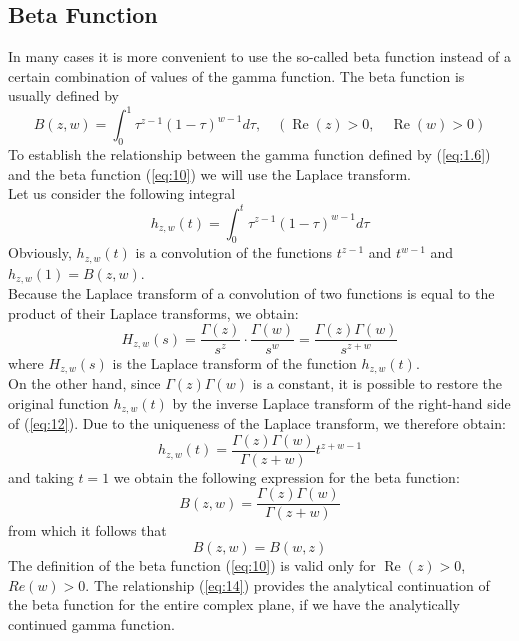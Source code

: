 \documentclass[a4paper,14pt,oneside]{book}
\theoremstyle{plain}
\theoremstyle{definition}
\theoremstyle{remark}
\begin{document}
\begin{center}
\begin{flushleft}
{\section{Beta Function}
In many cases it is more convenient to use the so-called beta function instead of a certain combination of values of the gamma function.
The beta function is usually defined by
\begin{equation}\label{eq:10}
B(z, w)=\int_{0}^{1} \tau^{z-1}(1-\tau)^{w-1} d \tau, \quad(\operatorname{Re}(z)>0, \quad \operatorname{Re}(w)>0)
\end{equation}
To establish the relationship between the gamma function defined by (\ref{eq:1.6}) and the beta function (\ref{eq:10}) we will use the Laplace transform.\\
Let us consider the following integral
\begin{equation}\label{eq:11}
h_{z, w}(t)=\int_{0}^{t} \tau^{z-1}(1-\tau)^{w-1} d \tau
\end{equation}
Obviously, $h_{z, w}(t)$ is a convolution of the functions $t^{z-1}$ and $t^{w-1}$ and $h_{z, w}(1)=B(z, w)$.\\
Because the Laplace transform of a convolution of two functions is equal to the product of their Laplace transforms, we obtain:
\begin{equation}\label{eq:12}
H_{z, w}(s)=\frac{\Gamma(z)}{s^{z}} \cdot \frac{\Gamma(w)}{s^{w}}=\frac{\Gamma(z) \Gamma(w)}{s^{z+w}}
\end{equation}
where $H_{z, w}(s)$ is the Laplace transform of the function $h_{z, w}(t)$.\\
On the other hand, since $\Gamma(z) \Gamma(w)$ is a constant, it is possible to restore the original function $h_{z, w}(t)$ by the inverse Laplace transform of the right-hand side of (\ref{eq:12}). Due to the uniqueness of the Laplace transform, we therefore obtain:
\begin{equation}\label{eq:13}
h_{z, w}(t)=\frac{\Gamma(z) \Gamma(w)}{\Gamma(z+w)} t^{z+w-1}
\end{equation}
and taking $t=1$ we obtain the following expression for the beta function:
\begin{equation}\label{eq:14}
B(z, w)=\frac{\Gamma(z) \Gamma(w)}{\Gamma(z+w)}
\end{equation}
from which it follows that
\begin{equation}\label{eq:15}
B(z, w)=B(w, z)
\end{equation}
The definition of the beta function (\ref{eq:10}) is valid only for $\operatorname{Re}(z)>0$, $Re(w)>0$. The relationship (\ref{eq:14}) provides the analytical continuation of the beta function for the entire complex plane, if we have the analytically continued gamma function.\\
}
\end{flushleft}
\end{center}
\end{document}
